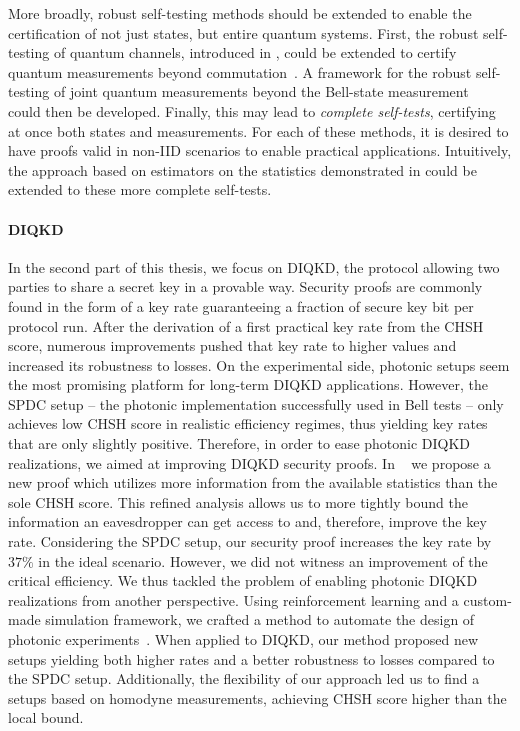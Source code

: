 \medbreak

More broadly, robust self-testing methods should be extended to enable the certification of not just states, but entire quantum systems.
First, the robust self-testing of quantum channels, introduced in \cite{Sekatski2018}, could be extended to certify quantum measurements beyond commutation~\cite{Kaniewski2017}.
A framework for the robust self-testing of joint quantum measurements beyond the Bell-state measurement~\cite{Bancal2018,Renou2018} could then be developed.
Finally, this may lead to \textit{complete self-tests}, certifying at once both states and measurements.
For each of these methods, it is desired to have proofs valid in non-IID scenarios to enable practical applications.
Intuitively, the approach based on estimators on the statistics demonstrated in \cite{Bancal2021} could be extended to these more complete self-tests. 



\paragraph{DIQKD}

In the second part of this thesis, we focus on \acrfull{DIQKD}, the protocol allowing two parties to share a secret key in a provable way.
Security proofs are commonly found in the form of a key rate guaranteeing a fraction of secure key bit per protocol run.
After the derivation of a first practical key rate from the CHSH score, numerous improvements pushed that key rate to higher values and increased its robustness to losses.
On the experimental side, photonic setups seem the most promising platform for long-term DIQKD applications.
However, the SPDC setup -- the photonic implementation successfully used in Bell tests -- only achieves low CHSH score in realistic efficiency regimes, thus yielding key rates that are only slightly positive.
Therefore, in order to ease photonic DIQKD realizations, we aimed at improving DIQKD security proofs.
In ~\cite{Sekatski2021} we propose a new proof which utilizes more information from the available statistics than the sole CHSH score.
This refined analysis allows us to more tightly bound the information an eavesdropper can get access to and, therefore, improve the key rate.
Considering the SPDC setup, our security proof increases the key rate by $37\%$ in the ideal scenario.
However, we did not witness an improvement of the critical efficiency.
We thus tackled the problem of enabling photonic DIQKD realizations from another perspective.
Using reinforcement learning and a custom-made simulation framework, we crafted a method to automate the design of photonic experiments~\cite{Valcarce2022b}.
When applied to DIQKD, our method proposed new setups yielding both higher rates and a better robustness to losses compared to the SPDC setup.
Additionally, the flexibility of our approach led us to find a setups based on homodyne measurements, achieving CHSH score higher than the local bound.

